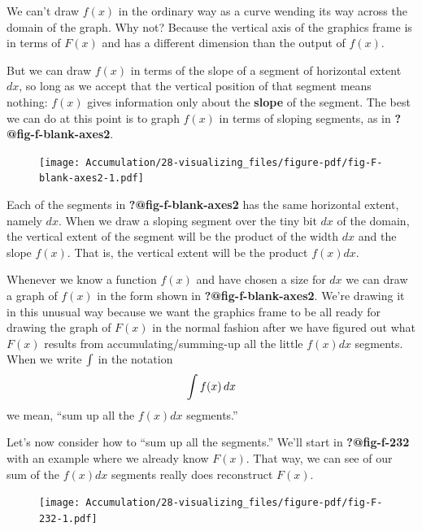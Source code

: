 \documentclass[
  letterpaper,
  DIV=11,
  numbers=noendperiod,
  oneside]{scrreprt}
\begin{document}
We can't draw \(f(x)\) in the ordinary way as a curve wending its way
across the domain of the graph. Why not? Because the vertical axis of
the graphics frame is in terms of \(F(x)\) and has a different dimension
than the output of \(f(x)\).

But we can draw \(f(x)\) in terms of the slope of a segment of
horizontal extent \(dx\), so long as we accept that the vertical
position of that segment means nothing: \(f(x)\) gives information only
about the \textbf{slope} of the segment. The best we can do at this
point is to graph \(f(x)\) in terms of sloping segments, as in
\textbf{?@fig-f-blank-axes2}.

\begin{figure}


{\centering \texttt{[image: Accumulation/28-visualizing\_files/figure-pdf/fig-F-blank-axes2-1.pdf]}

}

\end{figure}

Each of the segments in \textbf{?@fig-f-blank-axes2} has the same
horizontal extent, namely \(dx\). When we draw a sloping segment over
the tiny bit \(dx\) of the domain, the vertical extent of the segment
will be the product of the width \(dx\) and the slope \(f(x)\). That is,
the vertical extent will be the product \(f(x) dx\).

Whenever we know a function \(f(x)\) and have chosen a size for \(dx\)
we can draw a graph of \(f(x)\) in the form shown in
\textbf{?@fig-f-blank-axes2}. We're drawing it in this unusual way
because we want the graphics frame to be all ready for drawing the graph
of \(F(x)\) in the normal fashion after we have figured out what
\(F(x)\) results from accumulating/summing-up all the little \(f(x) dx\)
segments. When we write \(\large\int\) in the notation
\[\large \int f(x)\, dx\] we mean, ``sum up all the \(f(x) dx\)
segments.''

Let's now consider how to ``sum up all the segments.'' We'll start in
\textbf{?@fig-f-232} with an example where we already know \(F(x)\).
That way, we can see of our sum of the \(f(x) dx\) segments really does
reconstruct \(F(x)\).

\begin{figure}


{\centering \texttt{[image: Accumulation/28-visualizing\_files/figure-pdf/fig-F-232-1.pdf]}

}

\end{figure}
\end{document}
